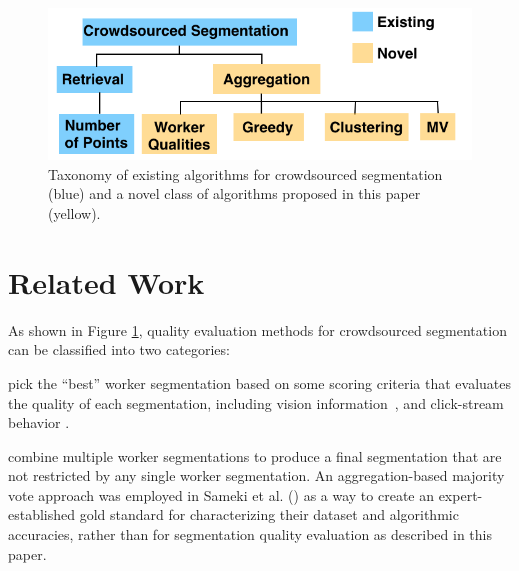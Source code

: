 \begin{figure}[h!]
\centering
\includegraphics[width=0.75\linewidth]{plots/flowchart.png}
\caption{Taxonomy of existing algorithms for crowdsourced segmentation (blue) and a novel class of algorithms proposed in this paper (yellow).} %
\label{flowchart}
\setlength{\belowcaptionskip}{-15pt}
\setlength{\abovecaptionskip}{-5pt} 
\vspace{-10pt}
\end{figure}
\section{Related Work\label{sec:related}}
As shown in Figure \ref{flowchart}, quality evaluation methods for crowdsourced segmentation can be classified into two categories:

 pick the ``best'' worker segmentation based on some scoring criteria that evaluates the quality of each segmentation, including vision information~\cite{Vittayakorn2011,Russakovsky2015}, and click-stream behavior \cite{Cabezas2015,Sameki2015,Sorokin2008}.%

 combine multiple worker segmentations to produce a final segmentation that are not restricted by any single worker segmentation. An aggregation-based majority vote approach was employed in Sameki et al. (\citeyear{Sameki2015}) as a way to create an expert-established gold standard for characterizing their dataset and algorithmic accuracies, rather than for segmentation quality evaluation as described in this paper.

